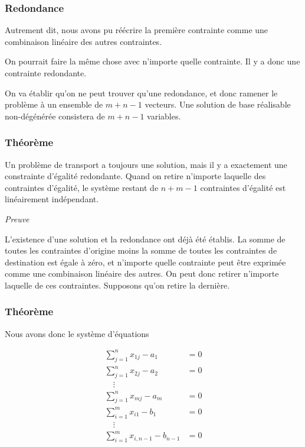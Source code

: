 \documentclass[usepdftitle=false]{beamer}
\begin{document}
\begin{frame}
\frametitle{Redondance}

Autrement dit, nous avons pu réécrire la première contrainte comme une combinaison linéaire des autres contraintes.

\mbox{}

On pourrait faire la même chose avec n'importe quelle contrainte. Il y a donc une contrainte redondante.

\mbox{}

On va établir qu'on ne peut trouver qu'une redondance, et donc ramener le problème à un ensemble de $m + n - 1$ vecteurs. Une solution de base réalisable non-dégénérée consistera de $m + n -1$ variables.

\end{frame}

\begin{frame}
\frametitle{Théorème}

Un problème de transport a toujours une solution, mais il y a exactement une constrainte d'égalité redondante.
Quand on retire n'importe laquelle des contraintes d'égalité, le système restant de $n+m-1$ contraintes d'égalité est linéairement indépendant.

\mbox{}

\emph{Preuve}

\mbox{}

L'existence d'une solution et la redondance ont déjà été établis.
La somme de toutes les contraintes d'origine moins la somme de toutes les contraintes de destination est égale à zéro, et n'importe quelle contrainte peut être exprimée comme une combinaison linéaire des autres. On peut donc retirer n'importe laquelle de ces contraintes. Supposons qu'on retire la dernière.

\end{frame}

\begin{frame}
\frametitle{Théorème}

Nous avons donc le système d'équations
\begin{footnotesize}
\begin{align*}
\sum_{j = 1}^n x_{1j} - a_1 & = 0  \\
\sum_{j = 1}^n x_{2j} - a_2 & = 0  \\
\quad \vdots & \\
\sum_{j = 1}^n x_{mj} - a_m & = 0  \\
\sum_{i = 1}^m x_{i1} - b_1 & = 0  \\
\quad \vdots & \\
\sum_{i = 1}^m x_{i,{n-1}} - b_{n-1} & = 0
\end{align*}
\end{footnotesize}

\end{frame}
\end{document}

